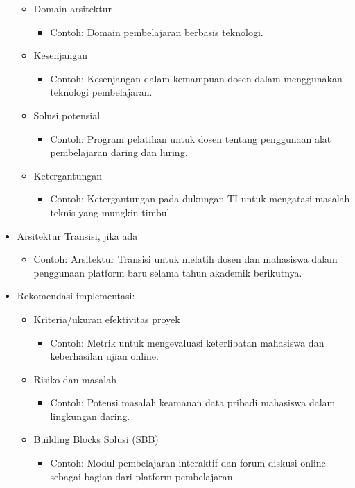 \begin{itemize}
\begin{itemize}
		\item Domain arsitektur
		\begin{itemize}
			\item Contoh: Domain pembelajaran berbasis teknologi.
		\end{itemize}
		\item Kesenjangan
		\begin{itemize}
			\item Contoh: Kesenjangan dalam kemampuan dosen dalam menggunakan teknologi pembelajaran.
		\end{itemize}
		\item Solusi potensial
		\begin{itemize}
			\item Contoh: Program pelatihan untuk dosen tentang penggunaan alat pembelajaran daring dan luring.
		\end{itemize}
		\item Ketergantungan
		\begin{itemize}
			\item Contoh: Ketergantungan pada dukungan TI untuk mengatasi masalah teknis yang mungkin timbul.
		\end{itemize}
	\end{itemize}
	\item Arsitektur Transisi, jika ada
	\begin{itemize}
		\item Contoh: Arsitektur Transisi untuk melatih dosen dan mahasiswa dalam penggunaan platform baru selama tahun akademik berikutnya.
	\end{itemize}
	\item Rekomendasi implementasi:
	\begin{itemize}
		\item Kriteria/ukuran efektivitas proyek
		\begin{itemize}
			\item Contoh: Metrik untuk mengevaluasi keterlibatan mahasiswa dan keberhasilan ujian online.
		\end{itemize}
		\item Risiko dan masalah
		\begin{itemize}
			\item Contoh: Potensi masalah keamanan data pribadi mahasiswa dalam lingkungan daring.
		\end{itemize}
		\item Building Blocks Solusi (SBB)
		\begin{itemize}
			\item Contoh: Modul pembelajaran interaktif dan forum diskusi online sebagai bagian dari platform pembelajaran.
		\end{itemize}
	\end{itemize}
\end{itemize}


